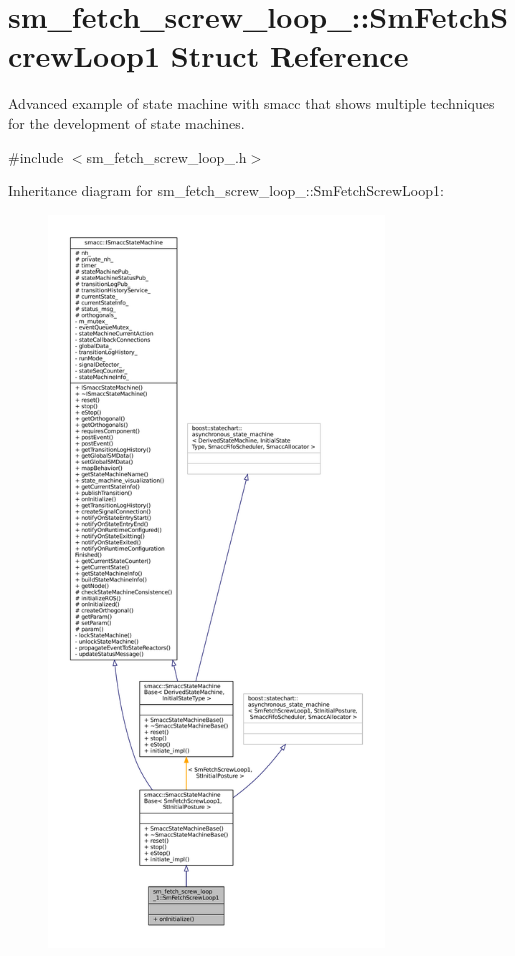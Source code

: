 \hypertarget{structsm__fetch__screw__loop__1_1_1SmFetchScrewLoop1}{}\section{sm\+\_\+fetch\+\_\+screw\+\_\+loop\+\_\+:\+:Sm\+Fetch\+Screw\+Loop1 Struct Reference}
\label{structsm__fetch__screw__loop__1_1_1SmFetchScrewLoop1}


Advanced example of state machine with smacc that shows multiple techniques for the development of state machines.  




{\ttfamily \#include $<$sm\+\_\+fetch\+\_\+screw\+\_\+loop\+\_.\+h$>$}



Inheritance diagram for sm\+\_\+fetch\+\_\+screw\+\_\+loop\+\_\+:\+:Sm\+Fetch\+Screw\+Loop1\+:
\nopagebreak
\begin{figure}[H]
\begin{center}
\leavevmode
\includegraphics[height=550pt]{structsm__fetch__screw__loop__1_1_1SmFetchScrewLoop1__inherit__graph}
\end{center}
\end{figure}


